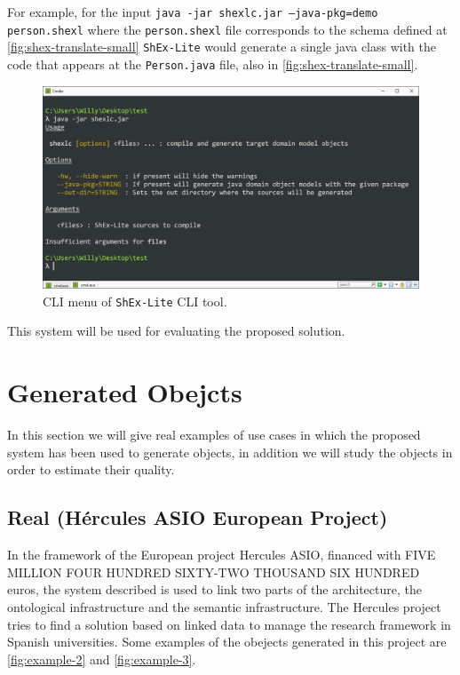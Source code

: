For example, for the input \texttt{java -jar shexlc.jar --java-pkg=demo person.shexl} where the \texttt{person.shexl}
file corresponds to the schema defined at \cref{fig:shex-translate-small} \texttt{ShEx-Lite} would generate a single java
class with the code that appears at the \texttt{Person.java} file, also in \cref{fig:shex-translate-small}.

\begin{figure}
    \includegraphics[width=\textwidth]{images/shexlc-menu.PNG}
    \centering
	\caption[CLI menu of \texttt{ShEx-Lite} CLI tool]{CLI menu of \texttt{ShEx-Lite} CLI tool.}
    \label{fig:menu-tool}
\end{figure}

This system
will be used for evaluating the proposed solution.

\section{Generated Obejcts}
In this section we will give real examples of use cases in which the proposed system has been used to generate objects,
in addition we will study the objects in order to estimate their quality.

\subsection{Real (Hércules ASIO European Project)}
In the framework of the European project Hercules ASIO, financed with FIVE MILLION FOUR HUNDRED SIXTY-TWO THOUSAND SIX HUNDRED
euros, the system described is used to link two parts of the architecture, the ontological infrastructure and the semantic 
infrastructure. The Hercules project tries to find a solution based on linked data to manage the research framework
in Spanish universities. Some examples of the obejects generated in this project are \cref{fig:example-2} and \cref{fig:example-3}.

